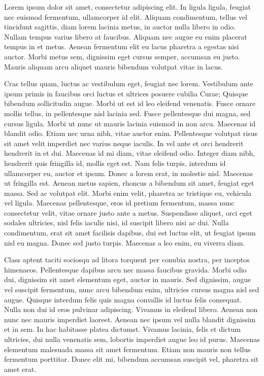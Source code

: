\documentclass[letterpaper,12pt,twocolumn,landscape]{memoir}
\begin{document}
Lorem ipsum dolor sit amet, consectetur adipiscing elit. In ligula ligula, feugiat nec euismod fermentum, ullamcorper id elit. Aliquam condimentum, tellus vel tincidunt sagittis, diam lorem lacinia metus, in auctor nulla libero in odio. Nullam tempus varius libero at faucibus. Aliquam nec augue eu enim placerat tempus in et metus. Aenean fermentum elit eu lacus pharetra a egestas nisi auctor. Morbi metus sem, dignissim eget cursus semper, accumsan eu justo. Mauris aliquam arcu aliquet mauris bibendum volutpat vitae in lacus.

Cras tellus quam, luctus ac vestibulum eget, feugiat nec lorem. Vestibulum ante ipsum primis in faucibus orci luctus et ultrices posuere cubilia Curae; Quisque bibendum sollicitudin augue. Morbi ut est id leo eleifend venenatis. Fusce ornare mollis tellus, in pellentesque nisl lacinia sed. Fusce pellentesque dui magna, sed cursus ligula. Morbi ut nunc ut mauris lacinia euismod in non arcu. Maecenas id blandit odio. Etiam nec urna nibh, vitae auctor enim. Pellentesque volutpat risus sit amet velit imperdiet nec varius neque iaculis. In vel ante et orci hendrerit hendrerit in et dui. Maecenas id mi diam, vitae eleifend odio. Integer diam nibh, hendrerit quis fringilla id, mollis eget est. Nam felis turpis, interdum id ullamcorper eu, auctor et ipsum. Donec a lorem erat, in molestie nisl. Maecenas ut fringilla est.
Aenean metus sapien, rhoncus a bibendum sit amet, feugiat eget massa. Sed ac volutpat elit. Morbi enim velit, pharetra ac tristique eu, vehicula vel ligula. Maecenas pellentesque, eros id pretium fermentum, massa nunc consectetur velit, vitae ornare justo ante a metus. Suspendisse aliquet, orci eget sodales ultricies, nisl felis iaculis nisi, id suscipit libero nisi ac dui. Nulla condimentum, erat sit amet facilisis dapibus, dui est luctus elit, ut feugiat ipsum nisl eu magna. Donec sed justo turpis. Maecenas a leo enim, eu viverra diam.

Class aptent taciti sociosqu ad litora torquent per conubia nostra, per inceptos himenaeos. Pellentesque dapibus arcu nec massa faucibus gravida. Morbi odio dui, dignissim sit amet elementum eget, auctor in mauris. Sed dignissim, augue vel suscipit fermentum, nunc arcu bibendum enim, ultricies cursus magna nisl sed augue. Quisque interdum felis quis magna convallis id luctus felis consequat. Nulla non dui id eros pulvinar adipiscing. Vivamus in eleifend libero. Aenean non nunc nec mauris imperdiet laoreet. Aenean nec ipsum vel nulla blandit dignissim et in sem. In hac habitasse platea dictumst. Vivamus lacinia, felis et dictum ultricies, dui nulla venenatis sem, lobortis imperdiet augue leo id purus. Maecenas elementum malesuada massa sit amet fermentum. Etiam non mauris non tellus fermentum porttitor. Donec elit mi, bibendum accumsan suscipit vel, pharetra sit amet erat.
\end{document}
